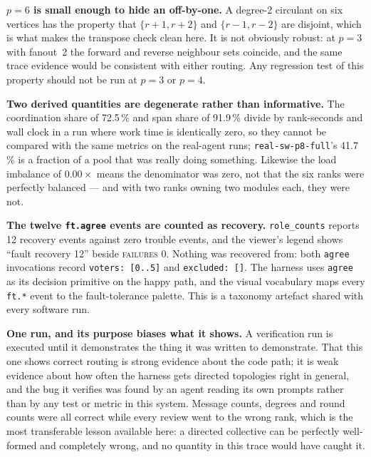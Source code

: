 \documentclass[11pt]{article}
\begin{document}
\textbf{$p=6$ is small enough to hide an off-by-one.} A degree-2 circulant on six vertices has
the property that $\{r{+}1, r{+}2\}$ and $\{r{-}1, r{-}2\}$ are disjoint, which is what makes
the transpose check clean here. It is not obviously robust: at $p = 3$ with fanout~2 the
forward and reverse neighbour sets coincide, and the same trace evidence would be consistent
with either routing. Any regression test of this property should not be run at $p = 3$ or
$p = 4$.

\textbf{Two derived quantities are degenerate rather than informative.} The coordination share
of 72.5\,\% and span share of 91.9\,\% divide by rank-seconds and wall clock in a run where
work time is identically zero, so they cannot be compared with the same metrics on the
real-agent runs; \texttt{real-sw-p8-full}'s 41.7\,\% is a fraction of a pool that was really
doing something. Likewise the load imbalance of $0.00\times$ means the denominator was zero,
not that the six ranks were perfectly balanced --- and with two ranks owning two modules each,
they were not.

\textbf{The twelve \texttt{ft.agree} events are counted as recovery.} \texttt{role\_counts}
reports 12 recovery events against zero trouble events, and the viewer's legend shows ``fault
recovery 12'' beside \textsc{failures} 0. Nothing was recovered from: both \texttt{agree}
invocations record \texttt{voters: [0..5]} and \texttt{excluded: []}. The harness uses
\texttt{agree} as its decision primitive on the happy path, and the visual vocabulary maps
every \texttt{ft.*} event to the fault-tolerance palette. This is a taxonomy artefact shared
with every software run.

\textbf{One run, and its purpose biases what it shows.} A verification run is executed until it
demonstrates the thing it was written to demonstrate. That this one shows correct routing is
strong evidence about the code path; it is weak evidence about how often the harness gets
directed topologies right in general, and the bug it verifies was found by an agent reading its
own prompts rather than by any test or metric in this system. Message counts, degrees and round
counts were all correct while every review went to the wrong rank, which is the most
transferable lesson available here: a directed collective can be perfectly well-formed and
completely wrong, and no quantity in this trace would have caught it.
\end{document}
